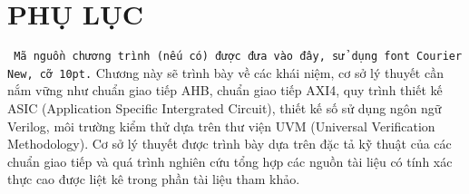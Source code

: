 \section*{PHỤ LỤC}
\texttt{
\fontsize{10pt}{0pt}\selectfont Mã nguồn chương trình (nếu có) được đưa vào đây, sử dụng font Courier New, cỡ 10pt.}
Chương này sẽ trình bày về các khái niệm, cơ sở lý thuyết cần nắm vững như chuẩn giao tiếp AHB, chuẩn giao tiếp AXI4, quy trình thiết kế ASIC (Application Specific Intergrated Circuit), thiết kế số sử dụng ngôn ngữ Verilog, môi trường kiểm thử dựa trên thư viện UVM (Universal Verification Methodology). Cơ sở lý thuyết được trình bày dựa trên đặc tả kỹ thuật của các chuẩn giao tiếp và quá trình nghiên cứu tổng hợp các nguồn tài liệu có tính xác thực cao được liệt kê trong phần tài liệu tham khảo.
